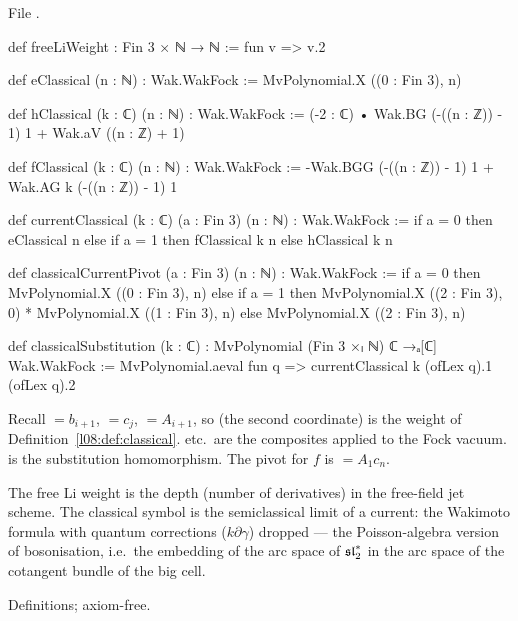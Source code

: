 \noindent File .
\begin{leancode}
def freeLiWeight : Fin 3 × ℕ → ℕ := fun v => v.2

def eClassical (n : ℕ) : Wak.WakFock := MvPolynomial.X ((0 : Fin 3), n)

def hClassical (k : ℂ) (n : ℕ) : Wak.WakFock :=
  (-2 : ℂ) • Wak.BG (-((n : ℤ)) - 1) 1 + Wak.aV ((n : ℤ) + 1)

def fClassical (k : ℂ) (n : ℕ) : Wak.WakFock :=
  -Wak.BGG (-((n : ℤ)) - 1) 1 + Wak.AG k (-((n : ℤ)) - 1) 1

def currentClassical (k : ℂ) (a : Fin 3) (n : ℕ) : Wak.WakFock :=
  if a = 0 then eClassical n else if a = 1 then fClassical k n else hClassical k n

def classicalCurrentPivot (a : Fin 3) (n : ℕ) : Wak.WakFock :=
  if a = 0 then MvPolynomial.X ((0 : Fin 3), n)
  else if a = 1 then
    MvPolynomial.X ((2 : Fin 3), 0) * MvPolynomial.X ((1 : Fin 3), n)
  else MvPolynomial.X ((2 : Fin 3), n)

def classicalSubstitution (k : ℂ) :
    MvPolynomial (Fin 3 ×ₗ ℕ) ℂ →ₐ[ℂ] Wak.WakFock :=
  MvPolynomial.aeval fun q => currentClassical k (ofLex q).1 (ofLex q).2
\end{leancode}

\begin{dictionary}
Recall  $=b_{i+1}$,  $=c_j$,  $=A_{i+1}$, so
 (the second coordinate) is the weight of Definition~\ref{l08:def:classical}.
 etc.\ are the composites applied to the Fock vacuum. 
is the substitution homomorphism. The pivot for $f$ is  $=A_1c_n$.
\end{dictionary}

\begin{physics}
The free Li weight is the depth (number of derivatives) in the free-field jet scheme. The classical
symbol is the semiclassical limit of a current: the Wakimoto formula with quantum corrections
($k\partial\gamma$) dropped --- the Poisson-algebra version of bosonisation, i.e.\ the embedding of the
arc space of $\mathfrak{sl}_2^*$ in the arc space of the cotangent bundle of the big cell.
\end{physics}

\begin{status}
Definitions; axiom-free.
\end{status}

